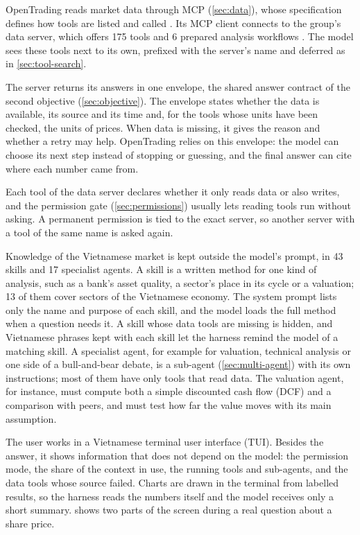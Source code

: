 \label{sec:tool-exposure}
OpenTrading reads market data through MCP (\cref{sec:data}), whose specification defines how tools are listed and called \parencite{modelcontextprotocol2025specification}.
Its MCP client connects to the group's data server, which offers \num{175} tools and 6 prepared analysis workflows \parencite{group2026opentradingmcp}.
The model sees these tools next to its own, prefixed with the server's name and deferred as in \cref{sec:tool-search}.

The server returns its answers in one envelope, the shared answer contract of the second objective (\cref{sec:objective}).
The envelope states whether the data is available, its source and its time and, for the tools whose units have been checked, the units of prices.
When data is missing, it gives the reason and whether a retry may help.
OpenTrading relies on this envelope: the model can choose its next step instead of stopping or guessing, and the final answer can cite where each number came from.

Each tool of the data server declares whether it only reads data or also writes, and the permission gate (\cref{sec:permissions}) usually lets reading tools run without asking.
A permanent permission is tied to the exact server, so another server with a tool of the same name is asked again.

\label{sec:skills}
Knowledge of the Vietnamese market is kept outside the model's prompt, in 43 skills and 17 specialist agents.
A skill is a written method for one kind of analysis, such as a bank's asset quality, a sector's place in its cycle or a valuation; 13 of them cover sectors of the Vietnamese economy.
The system prompt lists only the name and purpose of each skill, and the model loads the full method when a question needs it.
A skill whose data tools are missing is hidden, and Vietnamese phrases kept with each skill let the harness remind the model of a matching skill.
A specialist agent, for example for valuation, technical analysis or one side of a bull-and-bear debate, is a sub-agent (\cref{sec:multi-agent}) with its own instructions; most of them have only tools that read data.
The valuation agent, for instance, must compute both a simple discounted cash flow (DCF) and a comparison with peers, and must test how far the value moves with its main assumption.

\label{sec:interface}
The user works in a Vietnamese terminal user interface (TUI).
Besides the answer, it shows information that does not depend on the model: the permission mode, the share of the context in use, the running tools and sub-agents, and the data tools whose source failed.
Charts are drawn in the terminal from labelled results, so the harness reads the numbers itself and the model receives only a short summary.
 shows two parts of the screen during a real question about a share price.

